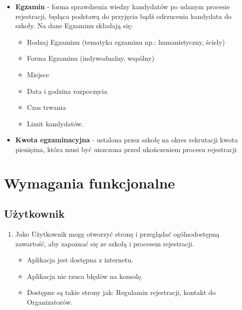\documentclass{article}
\begin{document}
\begin{itemize}
	\item \textbf{Egzamin} - forma sprawdzenia wiedzy kandydatów po udanym procesie rejestracji, będąca podstawą do przyjęcia bądź odrzucenia kandydata do szkoły. Na dane Egzaminu składają się:
	\begin{itemize}
	    \item Rodzaj Egzaminu (tematyka egzaminu np.: humanistyczny, ścisły)
	    \item Forma Egzaminu (indywodualny, wspólny)
	    \item Miejsce
	    \item Data i godzina rozpoczęcia
	    \item Czas trwania
	    \item Limit kandydatów.
	\end{itemize}
	\item \textbf{Kwota egzaminacyjna} - ustalona przez szkołę na okres rekrutacji kwota pieniężna, która musi być uiszczona przed ukończeniem procesu rejestracji
\end{itemize}

\section{Wymagania funkcjonalne}

\subsection{Użytkownik}
\begin{enumerate}
  \item Jako Użytkownik mogę otworzyć stronę i przeglądać ogólnodostępną zawartość, aby zapoznać się ze szkołą i procesem rejestracji.   
      \begin{itemize}
         \item Aplikacja jest dostępna z internetu.
         \item Aplikacja nie rzuca błędów na konsolę.
         \item Dostępne są takie strony jak: Regulamin rejestracji, kontakt do Organizatorów.
       \end{itemize}
\end{enumerate}
\end{document}
